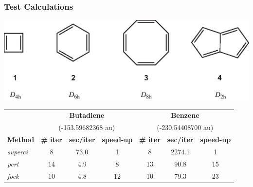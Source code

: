 \documentclass[]{beamer}
\begin{document}
\begin{frame}
  \frametitle{Test Calculations}
  \begin{center}
    \includegraphics[scale=0.45]{figures/compounds.eps}
  \end{center}
  \begin{table}\small
    \begin{center}
      \begin{tabular}{l c c c c c c}
        \hline
        &\multicolumn{3}{c}{\textbf{Butadiene}}&\multicolumn{3}{c}{\textbf{Benzene}}\\
        &\multicolumn{3}{c}{(-153.59682368 au)}&\multicolumn{3}{c}{(-230.54408700 au)}\\
        \textbf{Method}&\textbf{\# iter}&\textbf{sec/iter}&\textbf{speed-up}&\textbf{\# iter}&\textbf{sec/iter}&\textbf{speed-up}\\
        \hline
        \textit{superci}&8&73.0&1&8&2274.1&1\\
        \textit{pert}&14&4.9&8&13&90.8&15\\
        \textit{fock}&10&4.8&12&10&79.3&23\\
      \end{tabular}
    \end{center}
  \end{table}
\end{frame}
\end{document}
